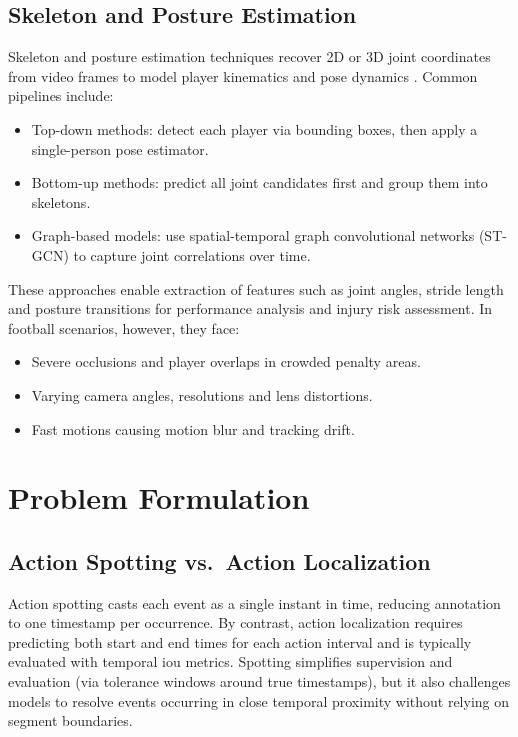 \subsection{Skeleton and Posture Estimation}
\label{ssec:skeleton_posture_estimation}

Skeleton and posture estimation techniques recover 2D or 3D joint coordinates from video frames to model player kinematics and pose dynamics \cite{elaoud_skeleton-based_2020, wang_skeleton_two-stream_2023, reilly__skeleton_just_pi_2023}. Common pipelines include:
\begin{itemize}
    \item Top-down methods: detect each player via bounding boxes, then apply a single-person pose estimator.
    \item Bottom-up methods: predict all joint candidates first and group them into skeletons.
    \item Graph-based models: use spatial-temporal graph convolutional networks (ST-GCN) to capture joint correlations over time\cite{yan_spatial_temporal_graph_convolutional_2018}.
\end{itemize}
These approaches enable extraction of features such as joint angles, stride length and posture transitions for performance analysis and injury risk assessment. In football scenarios, however, they face:
\begin{itemize}
    \item Severe occlusions and player overlaps in crowded penalty areas.
    \item Varying camera angles, resolutions and lens distortions.
    \item Fast motions causing motion blur and tracking drift\cite{survey_of_survey}.
\end{itemize} 


\section{Problem Formulation}
\label{sec:problem_formulation}

\subsection{Action Spotting vs.\ Action Localization}
Action spotting casts each event as a single instant in time, reducing annotation to one timestamp per occurrence. By contrast, action localization requires predicting both start and end times for each action interval and is typically evaluated with temporal \acrfull{iou} metrics. Spotting simplifies supervision and evaluation (via tolerance windows around true timestamps), but it also challenges models to resolve events occurring in close temporal proximity without relying on segment boundaries.

